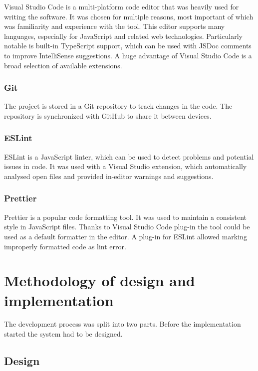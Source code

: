 Visual Studio Code is a multi-platform code editor that was heavily used for writing the software. It was chosen for multiple reasons, most important of which was familiarity and experience with the tool. This editor supports many languages, especially for JavaScript and related web technologies. Particularly notable is built-in TypeScript support, which can be used with JSDoc comments to improve IntelliSense suggestions. A huge advantage of Visual Studio Code is a broad selection of available extensions.

\subsubsection{Git}

The project is stored in a Git repository to track changes in the code. The repository is synchronized with GitHub to share it between devices.

\subsubsection{ESLint}

ESLint is a JavaScript linter, which can be used to detect problems and potential issues in code. It was used with a Visual Studio extension, which automatically analysed open files and provided in-editor warnings and suggestions.

\subsubsection{Prettier}

Prettier is a popular code formatting tool. It was used to maintain a consistent style in JavaScript files. Thanks to Visual Studio Code plug-in the tool could be used as a default formatter in the editor. A plug-in for ESLint allowed marking improperly formatted code as lint error.

\section{Methodology of design and implementation}

The development process was split into two parts. Before the implementation started the system had to be designed.

\subsection{Design}

